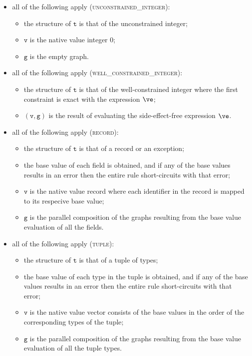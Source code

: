\documentclass{book}
\newcommand\vg[0]{\texttt{g}}
\newcommand\vv[0]{\texttt{v}}
\newcommand\vt[0]{\texttt{t}}
\begin{document}
\begin{itemize}
  \item all of the following apply (\textsc{unconstrained\_integer}):
  \begin{itemize}
    \item the structure of $\vt$ is that of the unconstrained integer;
    \item $\vv$ is the native value integer $0$;
    \item $\vg$ is the empty graph.
  \end{itemize}

  \item all of the following apply (\textsc{well\_constrained\_integer}):
  \begin{itemize}
    \item the structure of $\vt$ is that of the well-constrained integer where the first constraint
    is exact with the expression $\ve$;
    \item $(\vv, \vg)$ is the result of evaluating the side-effect-free expression $\ve$.
  \end{itemize}

  \item all of the following apply (\textsc{record}):
  \begin{itemize}
    \item the structure of $\vt$ is that of a record or an exception;
    \item the base value of each field is obtained, and if any of the base values results in an error
    then the entire rule short-circuits with that error;
    \item $\vv$ is the native value record where each identifier in the record is mapped to its
    respecive base value;
    \item $\vg$ is the parallel composition of the graphs resulting from the base value evaluation
    of all the fields.
  \end{itemize}

  \item all of the following apply (\textsc{tuple}):
  \begin{itemize}
    \item the structure of $\vt$ is that of a tuple of types;
    \item the base value of each type in the tuple is obtained, and if any of the base values results in an error
    then the entire rule short-circuits with that error;
    \item $\vv$ is the native value vector consists of the base values in the order of the corresponding types
    of the tuple;
    \item $\vg$ is the parallel composition of the graphs resulting from the base value evaluation
    of all the tuple types.
  \end{itemize}


\end{itemize}
\end{document}
